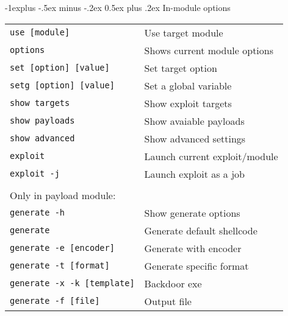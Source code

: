 \documentclass[10pt,landscape]{article}
\makeatletter
\renewcommand{\subsection}{\@startsection{subsection}{2}{0mm}%
                                {-1explus -.5ex minus -.2ex}%
                                {0.5ex plus .2ex}%
                                {\normalfont\normalsize\bfseries}}
\makeatother
\begin{document}
\begin{multicols}{2}
\subsection{In-module options}
\begin{tabular}{@{}ll@{}}
\verb!use [module]!  & Use target module\\
\verb!options!  & Shows current module options\\
\verb!set [option] [value]!  & Set target option\\
\verb!setg [option] [value]!  & Set a global variable\\
\verb!show targets!  & Show exploit targets\\
\verb!show payloads!  & Show avaiable payloads\\
\verb!show advanced!  & Show advanced settings\\
\verb!exploit!  & Launch current exploit/module\\
\verb!exploit -j!  & Launch exploit as a job\\
\\
Only in payload module:\\
\verb!generate -h!  & Show generate options\\
\verb!generate!  & Generate default shellcode\\
\verb!generate -e [encoder]!  & Generate with encoder\\
\verb!generate -t [format]!  & Generate specific format\\
\verb!generate -x -k [template]!  & Backdoor exe\\
\verb!generate -f [file]!  & Output file\\
\end{tabular}

\newlength{\MyLen}


\end{multicols}
\end{document}
